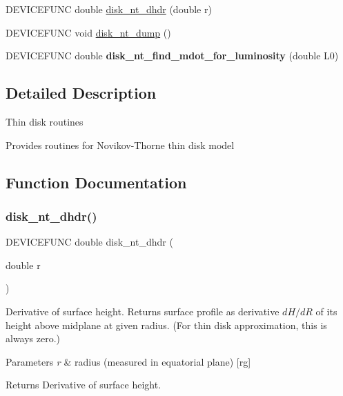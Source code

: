 \begin{DoxyCompactItemize}
\item 
D\+E\+V\+I\+C\+E\+F\+U\+NC double \hyperlink{sim5disk-nt_8c_aa85e75da9c7570c5e3896f3978e3bf70}{disk\+\_\+nt\+\_\+dhdr} (double r)
\item 
D\+E\+V\+I\+C\+E\+F\+U\+NC void \hyperlink{sim5disk-nt_8c_a4fd407e49157242787128aef15df4050}{disk\+\_\+nt\+\_\+dump} ()
\item 
\mbox{\label{sim5disk-nt_8c_a021ab3339770a9db8981fa427b1d345c}} 
D\+E\+V\+I\+C\+E\+F\+U\+NC double {\bfseries disk\+\_\+nt\+\_\+find\+\_\+mdot\+\_\+for\+\_\+luminosity} (double L0)
\end{DoxyCompactItemize}


\subsection{Detailed Description}
Thin disk routines

Provides routines for Novikov-\/\+Thorne thin disk model 

\subsection{Function Documentation}
\mbox{\label{sim5disk-nt_8c_aa85e75da9c7570c5e3896f3978e3bf70}} 
\subsubsection{\texorpdfstring{disk\+\_\+nt\+\_\+dhdr()}{disk\_nt\_dhdr()}}
{\footnotesize\ttfamily D\+E\+V\+I\+C\+E\+F\+U\+NC double disk\+\_\+nt\+\_\+dhdr (\begin{DoxyParamCaption}\item[{double}]{r }\end{DoxyParamCaption})}

Derivative of surface height. Returns surface profile as derivative $dH/dR$ of its height above midplane at given radius. (For thin disk approximation, this is always zero.)


\begin{DoxyParams}{Parameters}
{\em r} & radius (measured in equatorial plane) \mbox{[}rg\mbox{]}\\
\hline
\end{DoxyParams}
\begin{DoxyReturn}{Returns}
Derivative of surface height. 
\end{DoxyReturn}
\mbox{\label{sim5disk-nt_8c_a4fd407e49157242787128aef15df4050}} 
